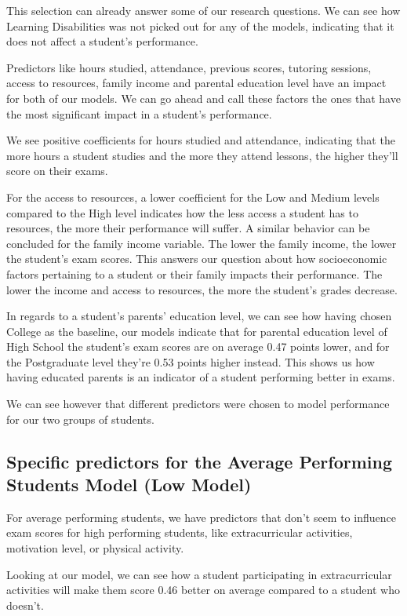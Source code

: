 \documentclass[twocolumn]{article} %
\begin{document}
This selection can already answer some of our research questions. We can see how Learning Disabilities was not picked out for any of the models, indicating that it does not affect a student's performance.

Predictors like hours studied, attendance, previous scores, tutoring sessions, access to resources, family income and parental education level have an impact for both of our models. We can go ahead and call these factors the ones that have the most significant impact in a student's performance.

We see positive coefficients for hours studied and attendance, indicating that the more hours a student studies and the more they attend lessons, the higher they'll score on their exams.

For the access to resources, a lower coefficient for the Low and Medium levels compared to the High level indicates how the less access a student has to resources, the more their performance will suffer. A similar behavior can be concluded for the family income variable. The lower the family income, the lower the student's exam scores. This answers our question about how socioeconomic factors pertaining to a student or their family impacts their performance. The lower the income and access to resources, the more the student's grades decrease.

In regards to a student's parents' education level, we can see how having chosen College as the baseline, our models indicate that for parental education level of High School the student's exam scores are on average 0.47 points lower, and for the Postgraduate level they're 0.53 points higher instead. This shows us how having educated parents is an indicator of a student performing better in exams.

We can see however that different predictors were chosen to model performance for our two groups of students.

\subsection*{Specific predictors for the Average Performing Students Model (Low Model)}
For average performing students, we have predictors that don't seem to influence exam scores for high performing students, like extracurricular activities, motivation level, or physical activity.

Looking at our model, we can see how a student participating in extracurricular activities will make them score 0.46 better on average compared to a student who doesn't.
\end{document}
